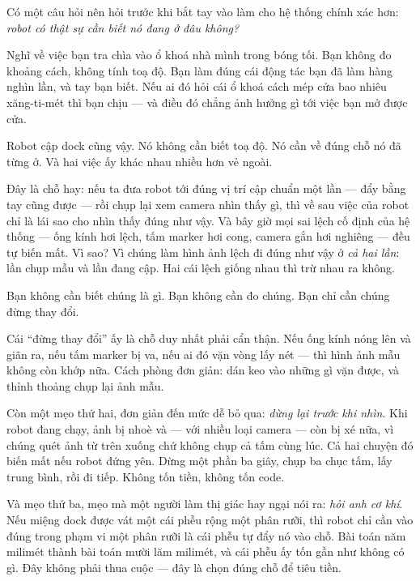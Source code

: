 \documentclass[../../marker.tex]{subfiles}
\begin{document}
\begin{dongian}
Có một câu hỏi nên hỏi trước khi bắt tay vào làm cho hệ thống chính xác hơn: \emph{robot có thật sự cần biết nó đang ở đâu không?}

Nghĩ về việc bạn tra chìa vào ổ khoá nhà mình trong bóng tối. Bạn không đo khoảng cách, không tính toạ độ. Bạn làm đúng cái động tác bạn đã làm hàng nghìn lần, và tay bạn biết. Nếu ai đó hỏi cái ổ khoá cách mép cửa bao nhiêu xăng-ti-mét thì bạn chịu --- và điều đó chẳng ảnh hưởng gì tới việc bạn mở được cửa.

Robot cập dock cũng vậy. Nó không cần biết toạ độ. Nó cần về đúng chỗ nó đã từng ở. Và hai việc ấy khác nhau nhiều hơn vẻ ngoài.

Đây là chỗ hay: nếu ta đưa robot tới đúng vị trí cập chuẩn một lần --- đẩy bằng tay cũng được --- rồi chụp lại xem camera nhìn thấy gì, thì về sau việc của robot chỉ là lái sao cho nhìn thấy đúng như vậy. Và bây giờ mọi sai lệch cố định của hệ thống --- ống kính hơi lệch, tấm marker hơi cong, camera gắn hơi nghiêng --- đều tự biến mất. Vì sao? Vì chúng làm hình ảnh lệch đi đúng như vậy ở \emph{cả hai lần}: lần chụp mẫu và lần đang cập. Hai cái lệch giống nhau thì trừ nhau ra không.

Bạn không cần biết chúng là gì. Bạn không cần đo chúng. Bạn chỉ cần chúng đừng thay đổi.

Cái ``đừng thay đổi'' ấy là chỗ duy nhất phải cẩn thận. Nếu ống kính nóng lên và giãn ra, nếu tấm marker bị va, nếu ai đó vặn vòng lấy nét --- thì hình ảnh mẫu không còn khớp nữa. Cách phòng đơn giản: dán keo vào những gì vặn được, và thỉnh thoảng chụp lại ảnh mẫu.

Còn một mẹo thứ hai, đơn giản đến mức dễ bỏ qua: \emph{dừng lại trước khi nhìn}. Khi robot đang chạy, ảnh bị nhoè và --- với nhiều loại camera --- còn bị xé nữa, vì chúng quét ảnh từ trên xuống chứ không chụp cả tấm cùng lúc. Cả hai chuyện đó biến mất nếu robot đứng yên. Dừng một phần ba giây, chụp ba chục tấm, lấy trung bình, rồi đi tiếp. Không tốn tiền, không tốn code.

Và mẹo thứ ba, mẹo mà một người làm thị giác hay ngại nói ra: \emph{hỏi anh cơ khí}. Nếu miệng dock được vát một cái phễu rộng một phân rưỡi, thì robot chỉ cần vào đúng trong phạm vi một phân rưỡi là cái phễu tự đẩy nó vào chỗ. Bài toán năm milimét thành bài toán mười lăm milimét, và cái phễu ấy tốn gần như không có gì. Đây không phải thua cuộc --- đây là chọn đúng chỗ để tiêu tiền.

\end{dongian}
\end{document}
